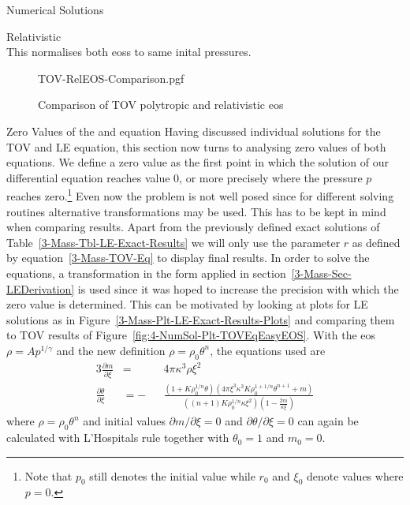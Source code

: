\begin{section}{Numerical Solutions}
\begin{subsection}{Relativistic \texorpdfstring{}{EoS}}
\begin{equation}
\end{equation}
This normalises both \acp{eos} to same inital pressures.
\begin{figure}
	\centering
	{TOV-RelEOS-Comparison.pgf}
	\caption[Comparison of TOV polytropic and relativistic EOS]{Comparison of TOV polytropic and relativistic \acs{eos}}
	\label{fig:4-NumSol-Plt-RelEOS-TOV-Comparison}
\end{figure}
\end{subsection}
%
%
\begin{subsection}{Zero Values of the \texorpdfstring{}{TOV} and \texorpdfstring{}{LE} equation}
\label{4-NumSol-Sec-TOV-Exponents}
Having discussed individual solutions for the \ac{TOV} and \ac{LE} equation, this section now turns to analysing zero values of both equations.
We define a zero value as the first point in which the solution of our differential equation reaches value $0$, or more precisely where the pressure $p$ reaches zero.\footnote{Note that $p_0$ still denotes the initial value while $r_0$ and $\xi_0$ denote values where $p=0$.}
Even now the problem is not well posed since for different solving routines alternative transformations may be used.
This has to be kept in mind when comparing results. 
Apart from the previously defined exact solutions of Table~\ref{3-Mass-Tbl-LE-Exact-Results} we will only use the parameter $r$ as defined by equation~\eqref{3-Mass-TOV-Eq} to display final results.
In order to solve the equations, a transformation in the form applied in section~\ref{3-Mass-Sec-LEDerivation} is used since it was hoped to increase the precision with which the zero value is determined.
This can be motivated by looking at plots for \ac{LE} solutions as in Figure~\ref{3-Mass-Plt-LE-Exact-Results-Plots} and comparing them to \ac{TOV} results of Figure~\ref{fig:4-NumSol-Plt-TOVEqEasyEOS}.
With the \ac{eos} $\rho=Ap^{1/\gamma}$ and the new definition $\rho=\rho_0\theta^n$, the equations used are 
\begin{alignat}{3}
	\frac{\partial m}{\partial\xi} &= &&4\pi\kappa^3\rho\xi^2\\
	\frac{\partial\theta}{\partial\xi} &= -&&\frac{\left(1+K\rho_0^{1/n}\theta\right)\left(4\pi\xi^3\kappa^3 K\rho_0^{1+1/n}\theta^{n+1}+ m\right)}{\left((n+1)K\rho_0^{1/n}\kappa\xi^2\right)\left(1-\frac{2 m}{\kappa\xi}\right)}
	\label{eq:4-NumSol-Equ-TOV-Exponents-Transf-TOV}
\end{alignat}
where $\rho=\rho_0\theta^n$ and initial values $\partial m/\partial\xi=0$ and $\partial\theta/\partial\xi=0$ can again be calculated with L'Hospitals rule together with $\theta_0=1$ and $ m_0=0$.

\end{subsection}
\end{section}
